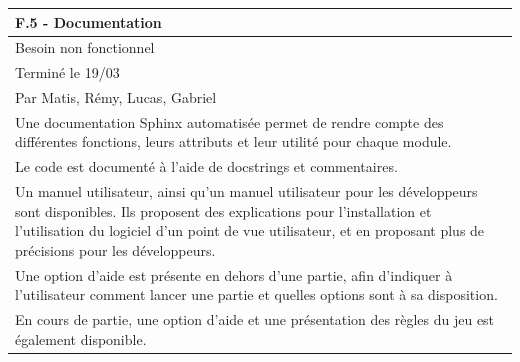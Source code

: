 \documentclass[a4paper,12pt]{article}
\begin{document}
\noindent
\setlength{\arrayrulewidth}{1.5pt}
\renewcommand{\arraystretch}{1.5}
\begin{tabularx}{\textwidth}{|X|}
    \hline
    \textbf{F.5 - Documentation}                                                                                                                                                                                                                                           \\
    \hline
    Besoin non fonctionnel                                                                                                                                                                                                                                                 \\
    \hline
    Terminé le 19/03                                                                                                                                                                                                                                                       \\
    Par Matis, Rémy, Lucas, Gabriel                                                                                                                                                                                                                                        \\
    \hline
    Une documentation Sphinx automatisée permet de rendre compte des différentes fonctions, leurs attributs et leur utilité pour chaque module.                                                                                                                            \\
    Le code est documenté à l’aide de docstrings et commentaires.                                                                                                                                                                                                          \\
    Un manuel utilisateur, ainsi qu’un manuel utilisateur pour les développeurs sont disponibles. Ils proposent des explications pour l’installation et l’utilisation du logiciel d’un point de vue utilisateur, et en proposant plus de précisions pour les développeurs. \\
    Une option d’aide est présente en dehors d’une partie, afin d’indiquer à l’utilisateur comment lancer une partie et quelles options sont à sa disposition.                                                                                                             \\
    En cours de partie, une option d’aide et une présentation des règles du jeu est également disponible.                                                                                                                                                                  \\
    \hline
\end{tabularx}
\end{document}
